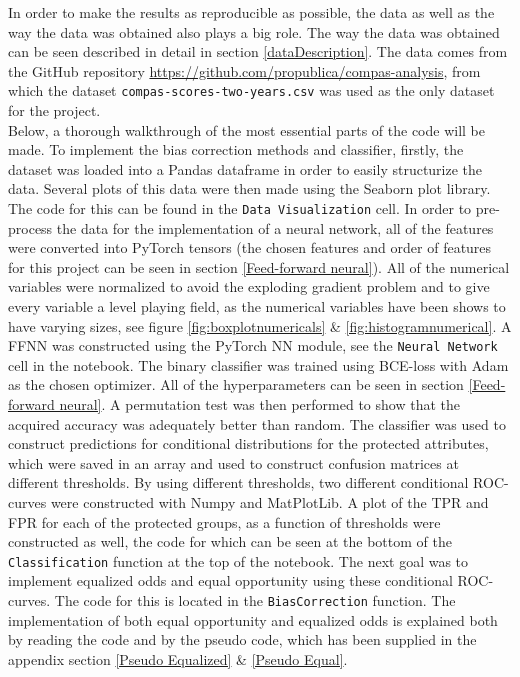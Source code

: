 \documentclass[11pt, fleqn, titlepage]{article}
\begin{document}
	In order to make the results as reproducible as possible, the data as well as the way the data was obtained also plays a big role. The way the data was obtained can be seen described in detail in section \ref{dataDescription}. The data comes from the GitHub repository \url{https://github.com/propublica/compas-analysis}, from which the dataset \texttt{compas-scores-two-years.csv} was used as the only dataset for the project. \\
	
	\noindent Below, a thorough walkthrough of the most essential parts of the code will be made. To implement the bias correction methods and classifier, firstly, the dataset was loaded into a Pandas dataframe in order to easily structurize the data. Several plots of this data were then made using the Seaborn plot library. The code for this can be found in the \texttt{Data Visualization} cell. In order to pre-process the data for the implementation of a neural network, all of the features were converted into PyTorch tensors (the chosen features and order of features for this project can be seen in section \ref{Feed-forward neural}). All of the numerical variables were normalized to avoid the exploding gradient problem and to give every variable a level playing field, as the numerical variables have been shows to have varying sizes, see figure \ref{fig:boxplotnumericals} \& \ref{fig:histogramnumerical}. A FFNN was constructed using the PyTorch NN module, see the \texttt{Neural Network} cell in the notebook. The binary classifier was trained using BCE-loss with Adam as the chosen optimizer. All of the hyperparameters can be seen in section \ref{Feed-forward neural}. A permutation test was then performed to show that the acquired accuracy was adequately better than random. The classifier was used to construct predictions for conditional distributions for the protected attributes, which were saved in an array and used to construct confusion matrices at different thresholds. By using different thresholds, two  different conditional ROC-curves were constructed with Numpy and MatPlotLib. A plot of the TPR and FPR for each of the protected groups, as a function of thresholds were constructed as well, the code for which can be seen at the bottom of the \texttt{Classification} function at the top of the notebook. The next goal was to implement equalized odds and equal opportunity using these conditional ROC-curves. The code for this is located in the \texttt{BiasCorrection} function. The implementation of both equal opportunity and equalized odds is explained both by reading the code and by the pseudo code, which has been supplied in the appendix section \ref{Pseudo Equalized} \& \ref{Pseudo Equal}.
	
\end{document}

